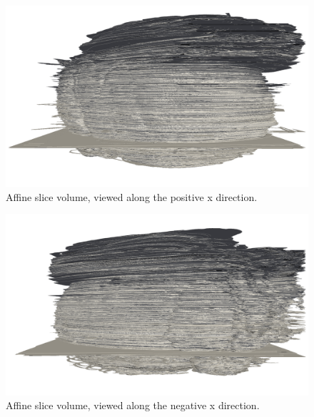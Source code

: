 	\begin{figure}
	  \centering
	  \includegraphics[width=0.9\textheight]{Ch7/Figs/Rat28/contours/whole_positive_x_affine}
	  \caption{Affine slice volume, viewed along the positive x direction.}
	  \label{fig:positive_x_affine_contour}
	\end{figure}

	\begin{figure}
	  \centering
	  \includegraphics[width=0.9\textheight]{Ch7/Figs/Rat28/contours/whole_negative_x_affine}
	  \caption{Affine slice volume, viewed along the negative x direction.}
	  \label{fig:negative_x_affine_contour}
	\end{figure}

